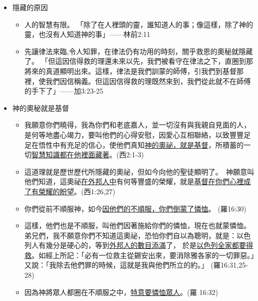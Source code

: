 \begin{itemize}
\item 隱藏的原因 
\begin{itemize}
\itemsep-.34em 
\item 人的智慧有限。 「除了在人裡頭的靈，誰知道人的事；像這樣，除了神的靈，也沒有人知道神的事」——林前2:11 
\item 先讓律法來臨,令人知罪，在律法仍有功用的時刻，關乎救恩的奧秘就隱藏了。 「但這因信得救的理還未來以先，我們被看守在律法之下，直圈到那將來的真道顯明出來。這樣，律法是我們訓蒙的師傅，引我們到基督那裡，使我們因信稱義。但這因信得救的理既然來到，我們從此就不在師傅的手下了」——加3:23-25 
\end{itemize}
\item 神的奧秘就是基督
\begin{itemize}
\itemsep-.25em 
\item 我願意你們曉得，我為你們和老底嘉人，並一切沒有與我親自見面的人，是何等地盡心竭力，要叫他們的心得安慰，因愛心互相聯絡，以致豐豐足足在悟性中有充足的信心，使他們真知\underline{神的奧祕，就是基督}，所積蓄的一切\underline{智慧知識都在他裡面藏著}。(西2:1-3)
\item 這道理就是歷世歷代所隱藏的奧祕，但如今向他的聖徒顯明了。  神願意叫他們知道，這奧祕\underline{在外邦人中}有何等豐盛的榮耀，就是\underline{基督在你們心裡成了有榮耀的盼望}。(西1:26,27)
\item 你們從前不順服神，如今\underline{因他們的不順服，你們倒蒙了憐恤}。  (羅16:30)
\item 這樣，他們也是不順服，叫他們因著施給你們的憐恤，現在也就蒙憐恤。弟兄們，我不願意你們不知道這奧祕，恐怕你們自以為聰明，就是：以色列人有幾分是硬心的，等到\underline{外邦人的數目添滿}了， 於是\underline{以色列全家都要得救}。如經上所記：「必有一位救主從錫安出來，要消除雅各家的一切罪惡。」又說：「我除去他們罪的時候，這就是我與他們所立的約。」 (羅16:31,25-28)
\item 因為神將眾人都圈在不順服之中，\underline{特意要憐恤眾人}。(羅
16:32)
\end{itemize}





\end{itemize}
